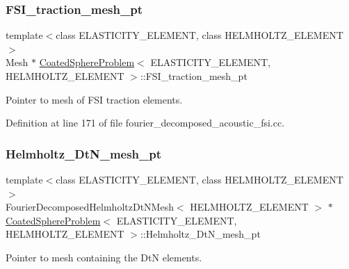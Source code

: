 \subsubsection{\texorpdfstring{F\+S\+I\+\_\+traction\+\_\+mesh\+\_\+pt}{FSI\_traction\_mesh\_pt}}
{\footnotesize\ttfamily template$<$class E\+L\+A\+S\+T\+I\+C\+I\+T\+Y\+\_\+\+E\+L\+E\+M\+E\+NT, class H\+E\+L\+M\+H\+O\+L\+T\+Z\+\_\+\+E\+L\+E\+M\+E\+NT$>$ \\
Mesh $\ast$ \hyperlink{classCoatedSphereProblem}{Coated\+Sphere\+Problem}$<$ E\+L\+A\+S\+T\+I\+C\+I\+T\+Y\+\_\+\+E\+L\+E\+M\+E\+NT, H\+E\+L\+M\+H\+O\+L\+T\+Z\+\_\+\+E\+L\+E\+M\+E\+NT $>$\+::F\+S\+I\+\_\+traction\+\_\+mesh\+\_\+pt\hspace{0.3cm}{\ttfamily [private]}}



Pointer to mesh of F\+SI traction elements. 



Definition at line 171 of file fourier\+\_\+decomposed\+\_\+acoustic\+\_\+fsi.\+cc.

\mbox{\label{classCoatedSphereProblem_abb33720ab0a096c5e1d6be33310bff21}} 
\subsubsection{\texorpdfstring{Helmholtz\+\_\+\+Dt\+N\+\_\+mesh\+\_\+pt}{Helmholtz\_DtN\_mesh\_pt}}
{\footnotesize\ttfamily template$<$class E\+L\+A\+S\+T\+I\+C\+I\+T\+Y\+\_\+\+E\+L\+E\+M\+E\+NT, class H\+E\+L\+M\+H\+O\+L\+T\+Z\+\_\+\+E\+L\+E\+M\+E\+NT$>$ \\
Fourier\+Decomposed\+Helmholtz\+Dt\+N\+Mesh$<$ H\+E\+L\+M\+H\+O\+L\+T\+Z\+\_\+\+E\+L\+E\+M\+E\+NT $>$ $\ast$ \hyperlink{classCoatedSphereProblem}{Coated\+Sphere\+Problem}$<$ E\+L\+A\+S\+T\+I\+C\+I\+T\+Y\+\_\+\+E\+L\+E\+M\+E\+NT, H\+E\+L\+M\+H\+O\+L\+T\+Z\+\_\+\+E\+L\+E\+M\+E\+NT $>$\+::Helmholtz\+\_\+\+Dt\+N\+\_\+mesh\+\_\+pt\hspace{0.3cm}{\ttfamily [private]}}



Pointer to mesh containing the DtN elements. 



